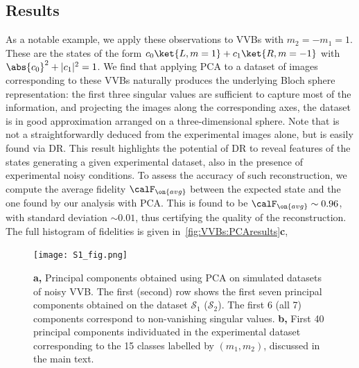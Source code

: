 \subsection{Results}

As a notable example, we apply these observations to VVBs with $m_2=-m_1=1$.
These are the states of the form $c_0 \ket{L,m=1} + c_1 \ket{R, m=-1}$ with $\abs{c_0}^2+|c_1|^2=1$.
We find that applying PCA to a dataset of images corresponding to these VVBs naturally produces the underlying Bloch sphere representation:
the first three singular values are sufficient to capture most of the information, and projecting the images along the corresponding axes, the dataset is in good approximation arranged on a three-dimensional sphere.
Note that is not a straightforwardly deduced from the experimental images alone, but is easily found via \ac{DR}.
This result highlights the potential of \ac{DR} to reveal features of the states generating a given experimental dataset, also in the presence of experimental noisy conditions.
To assess the accuracy of such reconstruction, we compute the average fidelity $\calF_{\on{avg}}$ between the expected state and the one found by our analysis with PCA.
This is found to be $\calF_{\on{avg}}\sim0.96$, with standard deviation $\sim0.01$, thus certifying the quality of the reconstruction.
The full histogram of fidelities is given in~\cref{fig:VVBs:PCAresults}\textbf{c}, 

\begin{figure}[tb]
  \centering
  \texttt{[image: S1\_fig.png]}
  \caption{
      \textbf{a,}
       Principal components obtained using PCA on simulated datasets of noisy VVB. The first (second) row shows the first seven principal components obtained on the dataset $\mathcal S_1$ ($\mathcal S_2$). 
       The first 6 (all 7) components correspond to non-vanishing singular values.
       \textbf{b,} First 40 principal components individuated in the experimental dataset corresponding to the 15 classes labelled by $(m_1,m_2)$, discussed in the main text.%
    }
    \label{fig:VVBs:principal_components}
\end{figure}



